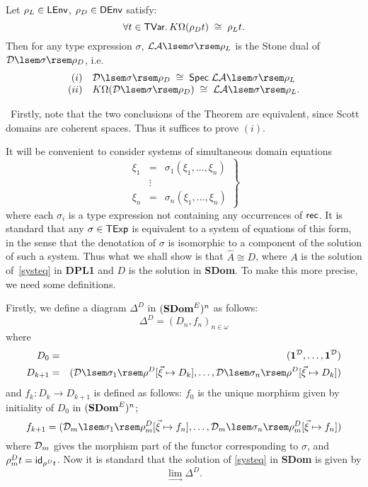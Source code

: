 \begin{theorem}
Let $\rho_{L} \in {\sf LEnv}$, $\rho_{D} \in {\sf DEnv}$ satisfy:
\[ \forall t \in {\sf TVar}. \, K \Omega (\rho_{D} t) \; \cong \; \rho_{L} t. \]
Then for any type expression $\sigma$, ${\cal LA} \lsem \sigma \rsem \rho_{L}$ is the Stone dual of ${\cal D} \lsem \sigma \rsem \rho_{D}$, i.e.
\[ \begin{array}{rl}
(i) & {\cal D} \lsem \sigma \rsem \rho_{D} \; \cong \; {\sf Spec} \; {\cal LA} \lsem \sigma \rsem \rho_{L} \\
(ii) & K \Omega ({\cal D} \lsem \sigma \rsem \rho_{D}) \; \cong \; 
{\cal LA} \lsem \sigma \rsem \rho_{L}. 
\end{array} \]
\end{theorem}

\proof\ Firstly, note that the two conclusions of the Theorem are equivalent, since Scott domains are coherent spaces. Thus it suffices to prove $(i)$.

It will be convenient to consider systems of simultaneous domain equations
\begin{equation}
\left. \begin{array}{rcl} 
\xi_{1} & = & \sigma_{1}(\xi_{1}, \ldots , \xi_{n})  \\
         & \vdots &  \label{systeq} \\
\xi_{n} & = & \sigma_{n}(\xi_{1}, \ldots , \xi_{n})
\end{array} \right\} 
\end{equation}
where each $\sigma_{i}$ is a type expression not containing any occurrences 
of ${\sf rec}$. 
It is standard that any $\sigma \in {\sf TExp}$ is equivalent to a system of 
equations of this form, in the sense that the denotation of $\sigma$ 
is isomorphic to a component of the solution of such a system. 
Thus what we shall show is that $\hat{A} \cong D$, where $A$ is the solution 
of~\ref{systeq} in {\bf DPL1} and $D$ is the solution in {\bf SDom}. 
To make this more precise, we need some definitions.

Firstly, we define a diagram $\Delta^{D}$ in $({\bf SDom}^{E})^{n}$ as follows:
\[ \Delta^{D} = (D_{n}, f_{n})_{n \in \omega} \]
where
\begin{eqnarray*}
D_{0} & = & ({\bf 1}^{\cal D}, \ldots , {\bf 1}^{\cal D}) \\
D_{k+1} & = & ({\cal D} \lsem \sigma_{1} \rsem \rho^{D} [\vec{\xi} \mapsto D_{k}], \ldots , {\cal D} \lsem \sigma_{n} \rsem \rho^{D} [\vec{\xi} \mapsto D_{k}])
\end{eqnarray*}
and $f_{k} : D_{k} \rightarrow D_{k+1}$ is defined as follows: $f_{0}$ is the unique morphism given by initiality of $D_{0}$ in $({\bf SDom}^{E})^{n}$;
\[ f_{k+1} =  ({\cal D}_{m} \lsem \sigma_{1} \rsem \rho_{m}^{D} [\vec{\xi} \mapsto f_{n}], \ldots , {\cal D}_{m} \lsem \sigma_{n} \rsem \rho_{m}^{D} [\vec{\xi} \mapsto f_{n}]) \]
where ${\cal D}_{m}$ gives the morphism part of the functor corresponding to $\sigma$, 
and $\rho_{m}^{D} t = {\sf id}_{\rho^{D} t}$. 
Now it is standard that the solution of \ref{systeq} in {\bf SDom} is given by 
\[ \lim_{\rightarrow} \Delta^{D}. \]

